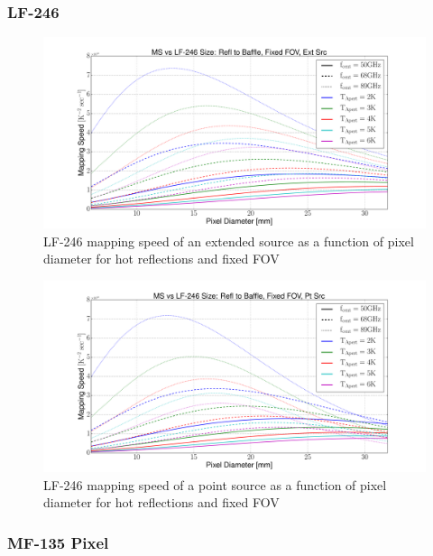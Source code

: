 \documentclass[12pt, titlepage]{article} %
\begin{document}

\subsubsection{LF-246}

\begin{figure}[H]
	\centering
	\includegraphics[width=1.1\textwidth, center]{PDF/LFT_MS_LF-246_hotRefl_fixFOV_extSrc.pdf}
	\caption{LF-246 mapping speed of an extended source as a function of pixel diameter for hot reflections and fixed FOV}
\end{figure}

\begin{figure}[H]
	\centering
	\includegraphics[width=1.1\textwidth, center]{PDF/LFT_MS_LF-246_hotRefl_fixFOV_ptSrc.pdf}
	\caption{LF-246 mapping speed of a point source as a function of pixel diameter for hot reflections and fixed FOV}
\end{figure}


\subsubsection{MF-135 Pixel}
\end{document}
